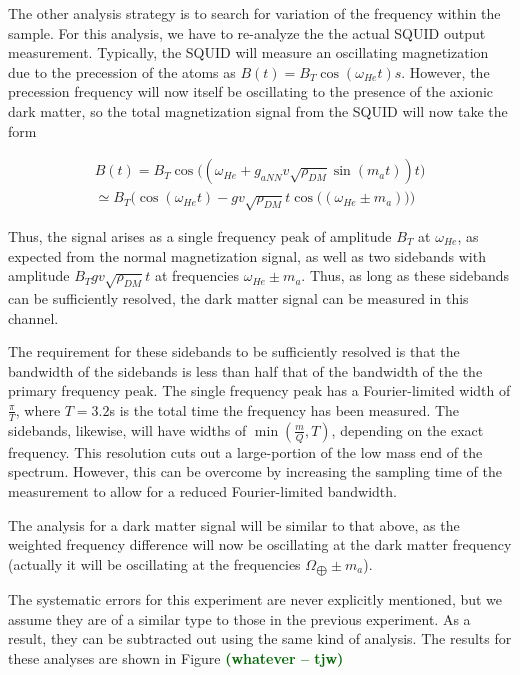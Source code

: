 \documentclass[aps,prd,final,letterpaper]{revtex4}
\newcommand{\tjw}[1]{\textbf{\textcolor{darkgreen}{(#1 -- tjw)}}}
\begin{document}
The other analysis strategy is to search for variation of the frequency within the sample. For this analysis, we have to re-analyze the the actual SQUID output measurement. Typically, the SQUID will measure an oscillating magnetization due to the precession of the atoms as $B(t) = B_T\cos{(\omega_{He}t)}s$. However, the precession frequency will now itself be oscillating to the presence of the axionic dark matter, so the total magnetization signal from the SQUID will now take the form

\begin{align}
B(t) = B_T\cos{\big(\left(\omega_{He} + g_{aNN}v\sqrt{\rho_{DM}}\sin{(m_a t)}\right)t\big)} \\
\simeq B_T\bigg(\cos{(\omega_{He}t)} - gv\sqrt{\rho_{DM}}t\cos{\big((\omega_{He} \pm m_a)\big)}\bigg)
\end{align}

Thus, the signal arises as a single frequency peak of amplitude $B_T$ at $\omega_{He}$, as expected from the normal magnetization signal, as well as two sidebands with amplitude $B_Tgv\sqrt{\rho_{DM}}t$ at frequencies $\omega_{He} \pm m_a$. Thus, as long as these sidebands can be sufficiently resolved, the dark matter signal can be measured in this channel. 

The requirement for these sidebands to be sufficiently resolved is that the bandwidth of the sidebands is less than half that of the bandwidth of the the primary frequency peak. The single frequency peak has a Fourier-limited width of $\frac{\pi}{T}$, where $T = 3.2$s is the total time the frequency has been measured. The sidebands, likewise, will have widths of $\min(\frac{m}{Q}, T)$, depending on the exact frequency. This resolution cuts out a large-portion of the low mass end of the spectrum. However, this can be overcome by increasing the sampling time of the measurement to allow for a reduced Fourier-limited bandwidth. 

The analysis for a dark matter signal will be similar to that above, as the weighted frequency difference will now be oscillating at the dark matter frequency (actually it will be oscillating at the frequencies $\Omega_{\bigoplus} \pm m_a$). 

The systematic errors for this experiment are never explicitly mentioned, but we assume they are of a similar type to those in the previous experiment. As a result, they can be subtracted out using the same kind of analysis. The results for these analyses are shown in Figure \tjw{whatever}



\begingroup
\renewcommand{\section}[2]{}%
\begin{thebibliography}{100}


\end{thebibliography}
\end{document}
